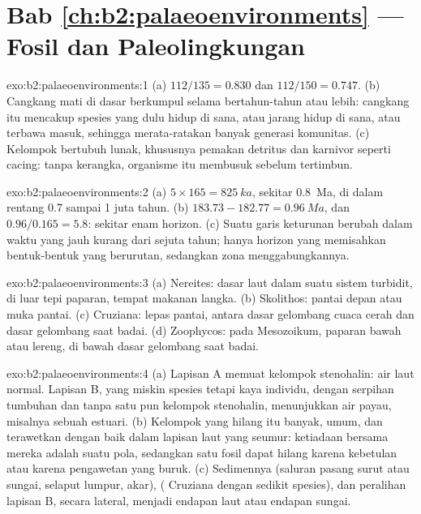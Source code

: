 \section*{Bab \ref{ch:b2:palaeoenvironments} --- Fosil dan Paleolingkungan}

\begin{solution}{exo:b2:palaeoenvironments:1}
(a) $112/135 = 0.830$ dan $112/150 = 0.747$. (b) Cangkang mati di dasar berkumpul selama bertahun-tahun
atau lebih: cangkang itu mencakup spesies yang dulu hidup di sana, atau jarang hidup di sana, atau terbawa masuk, sehingga
 merata-ratakan banyak generasi komunitas. (c) Kelompok bertubuh lunak, khususnya
pemakan detritus dan karnivor seperti cacing: tanpa kerangka, organisme itu membusuk sebelum tertimbun.
\end{solution}

\begin{solution}{exo:b2:palaeoenvironments:2}
(a) $5 \times 165 = \qty{825}{ka}$, sekitar \qty{0.8}{Ma}, di dalam rentang 0.7 sampai 1 juta tahun.
(b) $183.73 - 182.77 = \qty{0.96}{Ma}$, dan $0.96/0.165 = 5.8$: sekitar enam horizon. (c) Suatu
garis keturunan berubah dalam waktu yang jauh kurang dari sejuta tahun; hanya horizon yang memisahkan bentuk-bentuk
yang berurutan, sedangkan zona menggabungkannya.
\end{solution}

\begin{solution}{exo:b2:palaeoenvironments:3}
(a)  Nereites: dasar laut dalam suatu sistem turbidit, di luar tepi paparan, tempat
makanan langka. (b)  Skolithos: pantai depan atau muka pantai. (c)  Cruziana:
lepas pantai, antara dasar gelombang cuaca cerah dan dasar gelombang saat badai. (d)  Zoophycos: pada
Mesozoikum, paparan bawah atau lereng, di bawah dasar gelombang saat badai.
\end{solution}

\begin{solution}{exo:b2:palaeoenvironments:4}
(a) Lapisan A memuat kelompok stenohalin: air laut normal. Lapisan B, yang miskin spesies tetapi kaya
individu, dengan serpihan tumbuhan dan tanpa satu pun kelompok stenohalin, menunjukkan air payau, misalnya
sebuah estuari. (b) Kelompok yang hilang itu banyak, umum, dan terawetkan dengan baik dalam lapisan laut
yang seumur: ketiadaan bersama mereka adalah suatu pola, sedangkan satu fosil dapat hilang karena kebetulan atau
karena pengawetan yang buruk. (c) Sedimennya (saluran pasang surut atau sungai, selaput lumpur, akar),  ( Cruziana dengan sedikit spesies), dan peralihan lapisan B, secara lateral, menjadi
endapan laut atau endapan sungai.
\end{solution}

